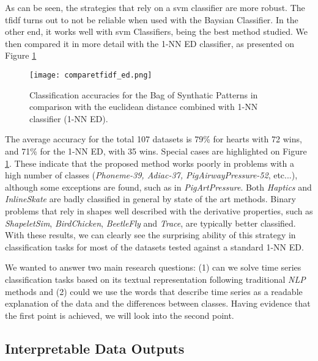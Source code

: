 As can be seen, the strategies that rely on a \gls{svm} classifier are more robust. The \gls{tfidf} turns out to not be reliable when used with the Baysian Classifier. In the other end, it works well with \gls{svm} Classifiers, being the best method studied. We then compared it in more detail with the 1-NN ED classifier, as presented on Figure \ref{fig:comparison_1}

\begin{figure}[h]
    \centering
    \texttt{[image: comparetfidf\_ed.png]}
    \caption{Classification accuracies for the Bag of Synthatic Patterns in comparison with the euclidean distance combined with 1-NN classifier (1-NN ED).}
    \label{fig:comparison_1}
\end{figure}

The average accuracy for the total 107 datasets is 79\% for \gls{hearts} with 72 wins, and 71\% for the 1-NN ED, with 35 wins. Special cases are highlighted on Figure \ref{fig:comparison_1}. These indicate that the proposed method works poorly in problems with a high number of classes (\textit{Phoneme-39, Adiac-37, PigAirwayPressure-52}, etc...), although some exceptions are found, such as in \textit{PigArtPressure}. Both \textit{Haptics} and \textit{InlineSkate} are badly classified in general by state of the art methods. Binary problems that rely in shapes well described with the derivative properties, such as \textit{ShapeletSim}, \textit{BirdChicken}, \textit{BeetleFly} and \textit{Trace}, are typically better classified. With these results, we can clearly see the surprising ability of this strategy in classification tasks for most of the datasets tested against a standard 1-NN ED.

We wanted to answer two main research questions: (1) can we solve time series classification tasks based on its textual representation following traditional \textit{NLP} methods and (2) could we use the words that describe time series as a readable explanation of the data and the differences between classes. Having evidence that the first point is achieved, we will look into the second point.

\subsection{Interpretable Data Outputs}

